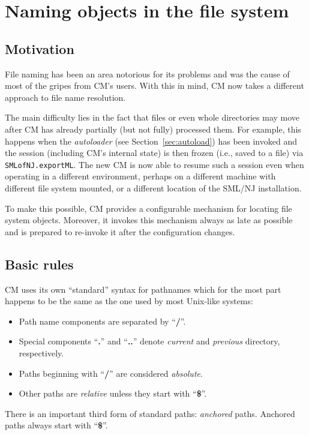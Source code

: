 \documentclass[titlepage,letterpaper]{article}
\begin{document}
\section{Naming objects in the file system}

\subsection{Motivation}

File naming has been an area notorious for its problems and was the
cause of most of the gripes from CM's users.  With this in mind, CM
now takes a different approach to file name resolution.

The main difficulty lies in the fact that files or even whole
directories may move after CM has already partially (but not fully)
processed them.  For example, this happens when the {\em autoloader}
(see Section~\ref{sec:autoload}) has been invoked and the session
(including CM's internal state) is then frozen (i.e., saved to a file)
via {\tt SMLofNJ.exportML}.  The new CM is now able to resume such a
session even when operating in a different environment, perhaps on a
different machine with different file system mounted, or a different
location of the SML/NJ installation.

To make this possible, CM provides a configurable mechanism for
locating file system objects.  Moreover, it invokes this mechanism
always as late as possible and is prepared to re-invoke it after the
configuration changes.

\subsection{Basic rules}
\label{sec:basicrules}

CM uses its own ``standard'' syntax for pathnames which for the most
part happens to be the same as the one used by most Unix-like systems:
\begin{itemize}
\item Path name components are separated by ``{\bf /}''.
\item Special components ``{\bf .}'' and ``{\bf ..}'' denote {\em
current} and {\em previous} directory, respectively.
\item Paths beginning
with ``{\bf /}'' are considered {\em absolute}.
\item Other paths are {\em relative} unless they start with ``{\bf \$}''.
\end{itemize}
\noindent There is an important third form of standard paths: {\em
anchored} paths.  Anchored paths always start with ``{\bf \$}''.
\end{document}
